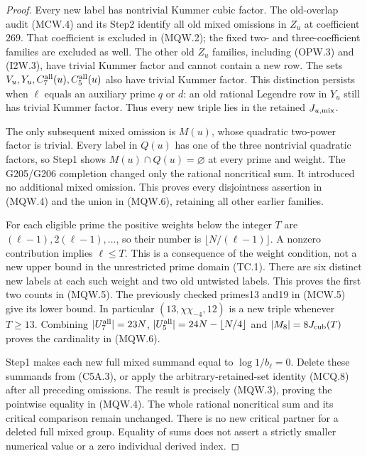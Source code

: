 \begin{proof}
Every new label has nontrivial Kummer cubic factor.
The old-overlap audit (MCW.4) and its Step2 identify all
old mixed omissions in $Z_u$ at coefficient $269$.
That coefficient is excluded in (MQW.2); the fixed two-
and three-coefficient families are excluded as well.
The other old $Z_u$ families, including (OPW.3) and (I2W.3),
have trivial Kummer factor and cannot contain a new row.
The sets $V_u,Y_u,C_7^{\rm all}(u),C_5^{\rm all}(u)$ also
have trivial Kummer factor. This distinction persists when
$\ell$ equals an auxiliary prime $q$ or $d$: an old rational
Legendre row in $Y_u$ still has trivial Kummer factor.
Thus every new triple lies in the retained $J_{u,\rm mix}$.

The only subsequent mixed omission is $M(u)$, whose quadratic
two-power factor is trivial. Every label in $Q(u)$ has one
of the three nontrivial quadratic factors, so Step1 shows
$M(u)\cap Q(u)=\varnothing$ at every prime and weight.
The G205/G206 completion changed only the rational noncritical
sum. It introduced no additional mixed omission.
This proves every disjointness assertion in (MQW.4) and
the union in (MQW.6), retaining all other earlier families.

For each eligible prime the positive weights below the integer
$T$ are $(\ell-1),2(\ell-1),\ldots$, so their number is
$\lfloor N/(\ell-1)\rfloor$. A nonzero contribution implies
$\ell\leq T$. This is a consequence of the weight condition,
not a new upper bound in the unrestricted prime domain (TC.1).
There are six distinct new labels at each such weight and
two old untwisted labels. This proves the first two counts
in (MQW.5). The previously checked primes13 and19 in (MCW.5)
give its lower bound. In particular $(13,\chi\chi_{-4},12)$
is a new triple whenever $T\geq13$.
Combining $|U_7^{\rm all}|=23N$, $|U_5^{\rm all}|=24N-\lfloor N/4\rfloor$
and $|M_8|=8J_{\rm cub}(T)$ proves the cardinality in (MQW.6).

Step1 makes each new full mixed summand equal to
$\log1/b_\ell=0$. Delete these summands from (C5A.3), or
apply the arbitrary-retained-set identity (MCQ.8) after all
preceding omissions. The result is precisely (MQW.3), proving
the pointwise equality in (MQW.4).
The whole rational noncritical sum and its critical comparison
remain unchanged. There is no new critical partner for a
deleted full mixed group. Equality of sums does not assert a
strictly smaller numerical value or a zero individual derived index.


\end{proof}
